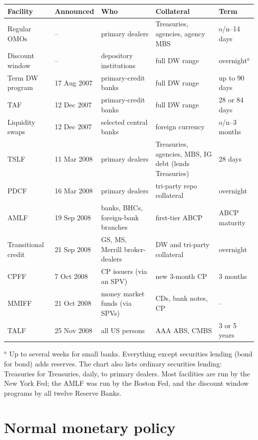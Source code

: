\begin{paracol}{2}
\begin{reading}
{\small\renewcommand{\arraystretch}{1.35}
\begin{tabularx}{\linewidth}{@{}l l L L l@{}}
\toprule
\textbf{Facility} & \textbf{Announced} & \textbf{Who} & \textbf{Collateral} & \textbf{Term}\\
\midrule
Regular OMOs & -- & primary dealers & Treasuries, agencies, agency MBS & o/n--14 days\\
Discount window & -- & depository institutions & full DW range & overnight$^{a}$\\
Term DW program & 17 Aug 2007 & primary-credit banks & full DW range & up to 90 days\\
TAF & 12 Dec 2007 & primary-credit banks & full DW range & 28 or 84 days\\
Liquidity swaps & 12 Dec 2007 & selected central banks & foreign currency & o/n--3 months\\
TSLF & 11 Mar 2008 & primary dealers & Treasuries, agencies, MBS, IG debt (lends Treasuries) & 28 days\\
PDCF & 16 Mar 2008 & primary dealers & tri-party repo collateral & overnight\\
AMLF & 19 Sep 2008 & banks, BHCs, foreign-bank branches & first-tier ABCP & ABCP maturity\\
Transitional credit & 21 Sep 2008 & GS, MS, Merrill broker-dealers & DW and tri-party collateral & overnight\\
CPFF & 7 Oct 2008 & CP issuers (via an SPV) & new 3-month CP & 3 months\\
MMIFF & 21 Oct 2008 & money market funds (via SPVs) & CDs, bank notes, CP & --\\
TALF & 25 Nov 2008 & all US persons & AAA ABS, CMBS & 3 or 5 years\\
\bottomrule
\end{tabularx}}
\par\smallskip
$^{a}$ Up to several weeks for small banks. Everything except securities lending (bond for bond) adds reserves. The chart also lists ordinary securities lending: Treasuries for Treasuries, daily, to primary dealers. Most facilities are run by the New York Fed; the AMLF was run by the Boston Fed, and the discount window programs by all twelve Reserve Banks.
\end{reading}

\section{Normal monetary policy}\label{sec:lr-normal}


\end{paracol}
